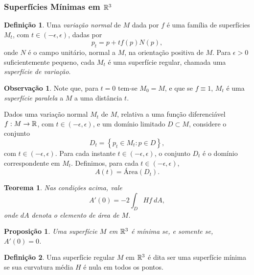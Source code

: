 \documentclass[12pt,a4paper]{beamer}
\newtheorem{teorema}{Teorema}
\newtheorem{proposicao}{Proposição}
\theoremstyle{definition}
\newtheorem{definicao}{Definição}
\newtheorem{observacao}{Observação}
\begin{document}
\begin{frame}[allowframebreaks]
	\frametitle{Superfícies Mínimas em $\mathbb R^3$}
	
	\begin{definicao}
		Uma \emph{variação normal} de $M$ dada por $f$ é uma família de superfícies $M_t$, com $t \in (-\epsilon,\epsilon)$, dadas por
		\begin{equation*}
		p_t = p + t f(p) N(p),
		\end{equation*}
		onde $N$ é o campo unitário, normal a $M$, na orientação positiva de $M$. Para $\epsilon > 0$ suficientemente pequeno, cada $M_t$ é uma superfície regular, chamada uma \emph{superfície de variação}.
	\end{definicao}

	\begin{observacao}
		Note que, para $t=0$ tem-se $M_0 = M$, e que se $f \equiv 1$, $M_t$ é uma \emph{superfície paralela} a $M$ a uma distância $t$.
	\end{observacao}

	Dados uma variação normal $M_t$ de $M$, relativa a uma função diferenciável $f: M \rightarrow \mathbb R$, com $t \in (-\epsilon,\epsilon)$, e um domínio limitado $D \subset M$, considere o conjunto
	\begin{equation*}
	D_t = \left\{ p_t \in M_t: p \in D \right\},
	\end{equation*}
	com $t \in (-\epsilon,\epsilon)$. Para cada instante $t \in (-\epsilon,\epsilon)$, o conjunto $D_t$ é o domínio correspondente em $M_t$. Definimos, para cada $t \in (-\epsilon,\epsilon)$,
	\begin{equation*}
	A(t) = \text{Área} (D_t).
	\end{equation*}
	
	\begin{teorema}
		Nas condições acima, vale
		\begin{equation}\label{primeira-variacao-da-area}
		A'(0) = -2 \int_D H f\ dA,
		\end{equation}
		onde $dA$ denota o elemento de área de $M$.
	\end{teorema}
	
	
	\begin{proposicao}\label{superficie-minima-como-ponto-critico-do-funcional-da-area}
		Uma superfície $M$ em $\mathbb R^3$ é mínima se, e somente se, $A'(0)=0$.
	\end{proposicao}
	
	\begin{definicao}
		Uma superfície regular $M$ em $\mathbb R^3$ é dita ser uma superfície mínima se sua curvatura
		média $H$ é nula em todos os pontos.
	\end{definicao}

	
\end{frame}
\end{document}
